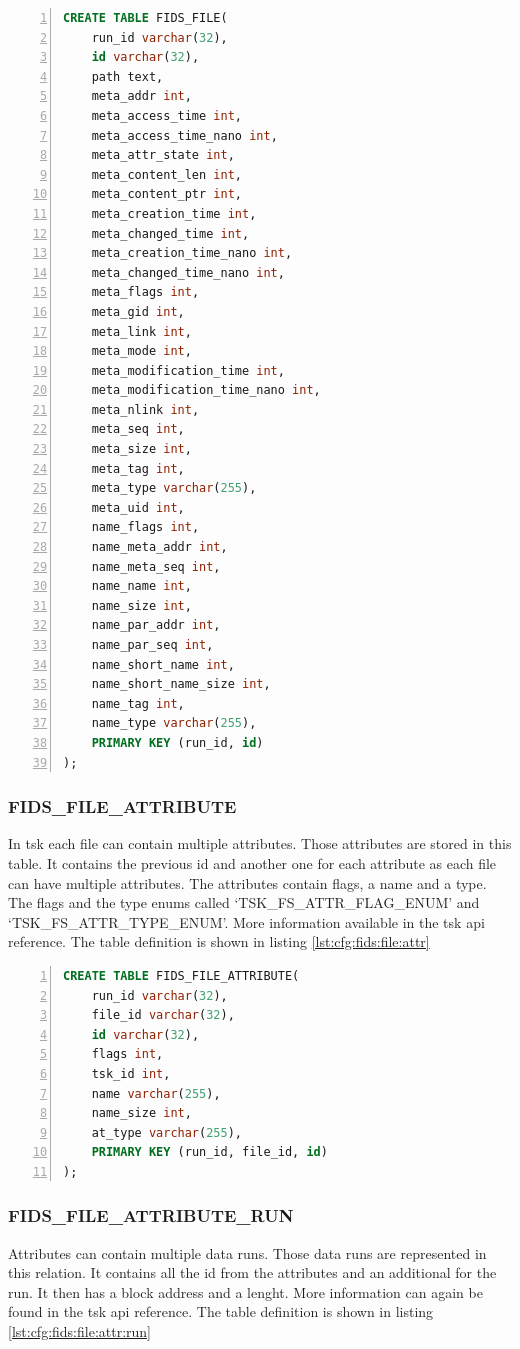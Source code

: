 \documentclass[
	a4paper,					%
	10pt,							%
	twoside,					%
	openright,				%
	notitlepage,			%
	parskip=half,			%
]{scrreprt}					%
\begin{document}
\begin{lstlisting}[language=sql, numbers=left, caption=Fids File Table Definition, label=lst:cfg:fids:file]
CREATE TABLE FIDS_FILE(
	run_id varchar(32),
	id varchar(32),
	path text, 
	meta_addr int,
	meta_access_time int,
	meta_access_time_nano int,
	meta_attr_state int,
	meta_content_len int,
	meta_content_ptr int,
	meta_creation_time int,
	meta_changed_time int,
	meta_creation_time_nano int,
	meta_changed_time_nano int,
	meta_flags int,
	meta_gid int,
	meta_link int,
	meta_mode int,
	meta_modification_time int,
	meta_modification_time_nano int,
	meta_nlink int,
	meta_seq int,
	meta_size int,
	meta_tag int,
	meta_type varchar(255),
	meta_uid int,
	name_flags int,
	name_meta_addr int,
	name_meta_seq int,
	name_name int,
	name_size int,
	name_par_addr int,
	name_par_seq int,
	name_short_name int,
	name_short_name_size int,
	name_tag int,
	name_type varchar(255),
	PRIMARY KEY (run_id, id)
);
\end{lstlisting}

\subsubsection{FIDS\_FILE\_ATTRIBUTE}

In \gls{tsk} each file can contain multiple attributes. Those attributes are stored in this table. It contains the previous \gls{id} and another one for each attribute as each file can have multiple attributes. The attributes contain flags, a name and a type. The flags and the type enums called `TSK\_FS\_ATTR\_FLAG\_ENUM' and `TSK\_FS\_ATTR\_TYPE\_ENUM'. More information available in the \gls{tsk} \gls{api} reference. \cite{tsk:attr:struct,tsk:file:header} The table definition is shown in listing \ref{lst:cfg:fids:file:attr}

\begin{lstlisting}[language=sql, numbers=left, caption=Fids File Attribute Table Definition, label=lst:cfg:fids:file:attr]
CREATE TABLE FIDS_FILE_ATTRIBUTE(
	run_id varchar(32),
	file_id varchar(32),
	id varchar(32),
	flags int,
	tsk_id int,
	name varchar(255),
	name_size int,
	at_type varchar(255), 
	PRIMARY KEY (run_id, file_id, id)
);
\end{lstlisting}

\subsubsection{FIDS\_FILE\_ATTRIBUTE\_RUN}

Attributes can contain multiple data runs. Those data runs are represented in this relation. It contains all the \gls{id} from the attributes and an additional for the run. It then has a block address and a lenght. More information can again be found in the \gls{tsk} \gls{api} reference. \cite{tsk:attr:run:struct} The table definition is shown in listing \ref{lst:cfg:fids:file:attr:run}
\end{document}
